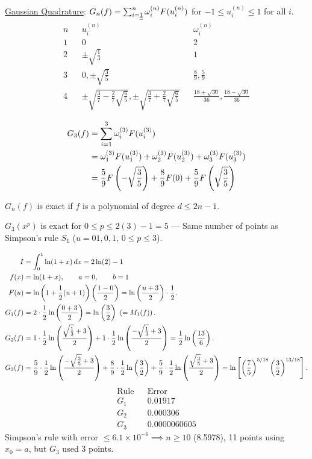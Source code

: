 \documentclass[]{article}
\begin{document}
\ul{Gaussian Quadrature}: $G_n(f) = \sum_{i=\underline{\underline{1}}}^n \omega_i^{(n)} F(u_i^{(n)})$ for $-1\leq u_i^{(n)}\leq 1$ for all $i$.
\begin{align*}
	n & & u_i^{(n)} & & \omega_i^{(n)} \\
	\hline
	1 & & 0 & & 2 \\
	2 & & \pm\sqrt{\frac13} & & 1 \\
	3 & & 0,\pm\sqrt{\frac35} & & \frac89,\frac59 \\
	4 & & \pm\sqrt{\frac37-\frac27\sqrt{\frac65}}, \pm\sqrt{\frac37+\frac27\sqrt{\frac65}} & & \frac{18+\sqrt{30}}{36}, \frac{18-\sqrt{30}}{36}
\end{align*}
\begin{example}
	\begin{align*}
		G_3(f) &= \sum_{i=1}^3 \omega_i^{(3)} F(u_i^{(3)}) \\
			   &= \omega_1^{(3)} F(u_1^{(3)}) + \omega_2^{(3)} F(u_2^{(3)}) + \omega_3^{(3)} F(u_3^{(3)}) \\
			   &= \frac59 F\left(-\sqrt{\frac35}\right) + \frac89 F(0) + \frac59 F\left(\sqrt{\frac35}\right)
	\end{align*}
\end{example}
\begin{fact}
	$G_n(f)$ is exact if $f$ is a polynomial of degree $d\leq2n-1$.
\end{fact}
\begin{example}
	$G_3(x^p)$ is exact for $0\leq p\leq 2(3)-1=5$ --- Same number of points as Simpson's rule $S_1$ ($u=01,0,1$, $0\leq p\leq3$).
\end{example}
\begin{example}
	\begin{align*}
		I &= \int_0^1 \ln(1+x)\,dx = 2\ln(2)-1 \\
		f(x) &= \ln(1+x), \qquad a=0, \qquad b=1 \\
		F(u) &= \ln\left(1+\frac12(u+1)\right)\left(\frac{1-0}2\right) = \ln\left(\frac{u+3}2\right)\cdot\frac12. \\
		G_1(f) &= 2\cdot\frac12\ln\left(\frac{0+3}2\right)=\ln\left(\frac32\right)\ \left(= M_1(f)\right). \\
		G_2(f) &= 1\cdot\frac12\ln\left(\frac{\sqrt{\frac13}+3}2\right)+1\cdot\frac12\ln\left(\frac{-\sqrt{\frac13}+3}2\right)
			   = \frac12\ln\left(\frac{13}6\right). \\
		G_3(f) &= \frac59\cdot\frac12\ln\left(\frac{-\sqrt{\frac35}+3}2\right) + \frac89\cdot\frac12\ln\left(\frac32\right) + \frac59\cdot\frac12\ln\left(\frac{\sqrt{\frac35}+3}2\right)
			   = \ln\left[\left(\frac75\right)^{5/18}\left(\frac32\right)^{13/18}\right].
	\end{align*}
	\begin{align*}
		\text{Rule} & & \text{Error} \\
		G_1 & & 0.01917 \\
		G_2 & & 0.000306 \\
		G_3 & & 0.0000060605
	\end{align*}
	Simpson's rule with error $\leq 6.1\times10^{-6} \implies n\geq10$ (8.5978), 11 points using $x_0=a$, but $G_3$ used 3 points.
\end{example}
\end{document}
